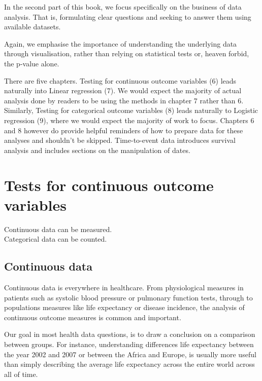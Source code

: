 \documentclass[12pt,]{krantz}
\renewenvironment{quote}{\begin{VF}}{\end{VF}}
\theoremstyle{definition}
\theoremstyle{definition}
\theoremstyle{definition}
\theoremstyle{remark}
\begin{document}
In the second part of this book, we focus specifically on the business
of data analysis. That is, formulating clear questions and seeking to
answer them using available datasets.

Again, we emphasise the importance of understanding the underlying data
through visualisation, rather than relying on statistical tests or,
heaven forbid, the p-value alone.

There are five chapters. Testing for continuous outcome variables (6)
leads naturally into Linear regression (7). We would expect the majority
of actual analysis done by readers to be using the methods in chapter 7
rather than 6. Similarly, Testing for categorical outcome variables (8)
leads naturally to Logistic regression (9), where we would expect the
majority of work to focus. Chapters 6 and 8 however do provide helpful
reminders of how to prepare data for these analyses and shouldn't be
skipped. Time-to-event data introduces survival analysis and includes
sections on the manipulation of dates.

\hypertarget{tests-for-continuous-outcome-variables}{%
\chapter{Tests for continuous outcome
variables}\label{tests-for-continuous-outcome-variables}}


\begin{quote}
Continuous data can be measured.\\
Categorical data can be counted.
\end{quote}

\hypertarget{continuous-data}{%
\section{Continuous data}\label{continuous-data}}

Continuous data is everywhere in healthcare. From physiological measures
in patients such as systolic blood pressure or pulmonary function tests,
through to populations measures like life expectancy or disease
incidence, the analysis of continuous outcome measures is common and
important.

Our goal in most health data questions, is to draw a conclusion on a
comparison between groups. For instance, understanding differences life
expectancy between the year 2002 and 2007 or between the Africa and
Europe, is usually more useful than simply describing the average life
expectancy across the entire world across all of time.
\end{document}
